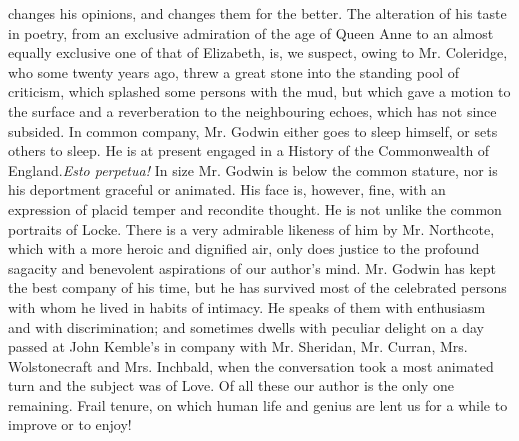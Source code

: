 changes his opinions, and changes them for the better. The
alteration of his taste in poetry, from an exclusive admiration of
the age of Queen Anne to an almost equally exclusive one of that
of Elizabeth, is, we suspect, owing to Mr. Coleridge, who some
twenty years ago, threw a great stone into the standing pool of
criticism, which splashed some persons with the mud, but which
gave a motion to the surface and a reverberation to the
neighbouring echoes, which has not since subsided. In common
company, Mr. Godwin either goes to sleep himself, or sets others
to sleep. He is at present engaged in a History of the
Commonwealth of England.\textemdash \emph{Esto perpetua!} In size
Mr. Godwin is below the common stature, nor is his deportment
graceful or animated. His face is, however, fine, with an
expression of placid temper and recondite thought. He is not
unlike the common portraits of Locke. There is a very admirable
likeness of him by Mr. Northcote, which with a more heroic and
dignified air, only does justice to the profound sagacity and
benevolent aspirations of our author's mind. Mr. Godwin has kept
the best company of his time, but he has survived most of the
celebrated persons with whom he lived in habits of intimacy. He
speaks of them with enthusiasm and with discrimination; and
sometimes dwells with peculiar delight on a day passed at John
Kemble's in company with Mr. Sheridan, Mr. Curran,
Mrs. Wolstonecraft and Mrs. Inchbald, when the conversation took a
most animated turn and the subject was of Love. Of all these our
author is the only one remaining. Frail tenure, on which human
life and genius are lent us for a while to improve or to enjoy!
